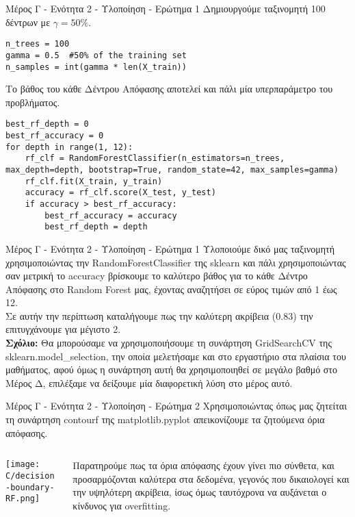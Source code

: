 \documentclass{beamer}
\begin{document}
\begin{frame}[fragile]{Μέρος Γ - Ενότητα 2 - Υλοποίηση - Ερώτημα 1}
Δημιουργούμε ταξινομητή 100 δέντρων με $\gamma = 50\%$.
\lstset{style=python}
\begin{lstlisting}
n_trees = 100
gamma = 0.5  #50% of the training set
n_samples = int(gamma * len(X_train)) 
\end{lstlisting}
Το βάθος του κάθε Δέντρου Απόφασης αποτελεί και πάλι μία υπερπαράμετρο του προβλήματος. 
\lstset{style=python}
\begin{lstlisting}
best_rf_depth = 0
best_rf_accuracy = 0
for depth in range(1, 12):
    rf_clf = RandomForestClassifier(n_estimators=n_trees, max_depth=depth, bootstrap=True, random_state=42, max_samples=gamma)
    rf_clf.fit(X_train, y_train)
    accuracy = rf_clf.score(X_test, y_test)
    if accuracy > best_rf_accuracy:
        best_rf_accuracy = accuracy
        best_rf_depth = depth
\end{lstlisting}
\end{frame}
\begin{frame}{Μέρος Γ - Ενότητα 2 - Υλοποίηση - Ερώτημα 1}
Υλοποιούμε δικό μας ταξινομητή χρησιμοποιώντας την RandomForestClassifier της sklearn και πάλι χρησιμοποιώντας σαν μετρική το accuracy βρίσκουμε το καλύτερο βάθος για το κάθε Δέντρο Απόφασης στο Random Forest μας, έχοντας αναζητήσει σε εύρος τιμών από 1 έως 12.\\
Σε αυτήν την περίπτωση καταλήγουμε πως την καλύτερη ακρίβεια (0.83) την επιτυγχάνουμε για  μέγιστο 2.\\
\vspace{0.3cm}
\textbf{Σχόλιο:} Θα μπορούσαμε να χρησιμοποιήσουμε τη συνάρτηση GridSearchCV της sklearn.model\_selection, την οποία μελετήσαμε και στο εργαστήριο στα πλαίσια του μαθήματος, αφού όμως η συνάρτηση αυτή θα χρησιμοποιηθεί σε μεγάλο βαθμό στο Μέρος Δ, επιλέξαμε να δείξουμε μία διαφορετική λύση στο μέρος αυτό.
\end{frame}
\begin{frame}{Μέρος Γ - Ενότητα 2 - Υλοποίηση - Ερώτημα 2}
Χρησιμοποιώντας όπως μας ζητείται τη συνάρτηση contourf της matplotlib.pyplot απεικονίζουμε τα ζητούμενα όρια απόφασης.
\begin{columns}[c]
    \begin{column}{0.7\textwidth}
        \texttt{[image: C/decision-boundary-RF.png]}
    \end{column}
    
    \begin{column}{0.33\textwidth}
        Παρατηρούμε πως τα όρια απόφασης έχουν γίνει πιο σύνθετα, και προσαρμόζονται καλύτερα στα δεδομένα, γεγονός που δικαιολογεί και την υψηλότερη ακρίβεια, ίσως όμως ταυτόχρονα να αυξάνεται ο κίνδυνος για overfitting.
    \end{column}
\end{columns}
\end{frame}
\end{document}
